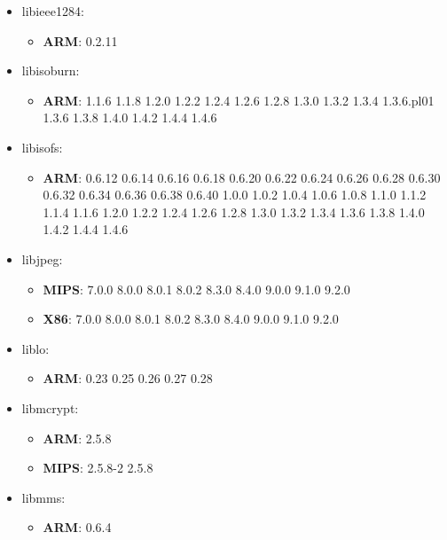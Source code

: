 \documentclass[twocolumn,a4paper]{IEEEtran} %
\begin{document}
\begin{itemize}[noitemsep,topsep=0pt,parsep=0pt,partopsep=0pt]
\item libieee1284:
\begin{itemize}[noitemsep,topsep=0pt,parsep=0pt,partopsep=0pt]
  \item \textbf{ARM}: 0.2.11
\end{itemize}

\item libisoburn:
\begin{itemize}[noitemsep,topsep=0pt,parsep=0pt,partopsep=0pt]
  \item \textbf{ARM}: 1.1.6 1.1.8 1.2.0 1.2.2 1.2.4 1.2.6 1.2.8 1.3.0 1.3.2 1.3.4 1.3.6.pl01 1.3.6 1.3.8 1.4.0 1.4.2 1.4.4 1.4.6
\end{itemize}

\item libisofs:
\begin{itemize}[noitemsep,topsep=0pt,parsep=0pt,partopsep=0pt]
  \item \textbf{ARM}: 0.6.12 0.6.14 0.6.16 0.6.18 0.6.20 0.6.22 0.6.24 0.6.26 0.6.28 0.6.30 0.6.32 0.6.34 0.6.36 0.6.38 0.6.40 1.0.0 1.0.2 1.0.4 1.0.6 1.0.8 1.1.0 1.1.2 1.1.4 1.1.6 1.2.0 1.2.2 1.2.4 1.2.6 1.2.8 1.3.0 1.3.2 1.3.4 1.3.6 1.3.8 1.4.0 1.4.2 1.4.4 1.4.6
\end{itemize}

\item libjpeg:
\begin{itemize}[noitemsep,topsep=0pt,parsep=0pt,partopsep=0pt]
  \item \textbf{MIPS}: 7.0.0 8.0.0 8.0.1 8.0.2 8.3.0 8.4.0 9.0.0 9.1.0 9.2.0
  \item \textbf{X86}: 7.0.0 8.0.0 8.0.1 8.0.2 8.3.0 8.4.0 9.0.0 9.1.0 9.2.0
\end{itemize}

\item liblo:
\begin{itemize}[noitemsep,topsep=0pt,parsep=0pt,partopsep=0pt]
  \item \textbf{ARM}: 0.23 0.25 0.26 0.27 0.28
\end{itemize}

\item libmcrypt:
\begin{itemize}[noitemsep,topsep=0pt,parsep=0pt,partopsep=0pt]
  \item \textbf{ARM}: 2.5.8
  \item \textbf{MIPS}: 2.5.8-2 2.5.8
\end{itemize}

\item libmms:
\begin{itemize}[noitemsep,topsep=0pt,parsep=0pt,partopsep=0pt]
  \item \textbf{ARM}: 0.6.4
\end{itemize}


\end{itemize}
\end{document}
